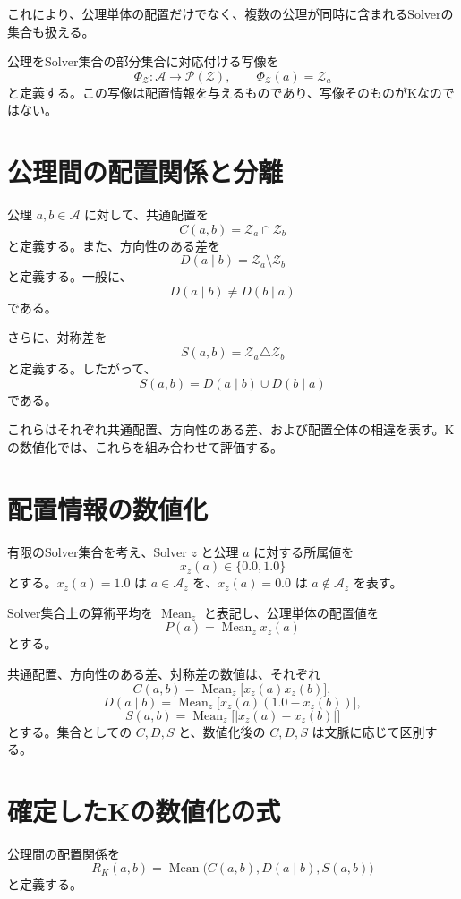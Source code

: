 \documentclass[a4paper,12pt]{article}
\begin{document}
これにより、公理単体の配置だけでなく、複数の公理が同時に含まれるSolverの集合も扱える。

公理をSolver集合の部分集合に対応付ける写像を
\[
\Phi_{\mathcal{Z}}:\mathcal{A}\to\mathcal{P}(\mathcal{Z}),
\qquad
\Phi_{\mathcal{Z}}(a)=\mathcal{Z}_a
\]
と定義する。この写像は配置情報を与えるものであり、写像そのものがKなのではない。

\section{公理間の配置関係と分離}

公理 $a,b\in\mathcal{A}$ に対して、共通配置を
\[
C(a,b)=\mathcal{Z}_a\cap\mathcal{Z}_b
\]
と定義する。また、方向性のある差を
\[
D(a\mid b)=\mathcal{Z}_a\setminus\mathcal{Z}_b
\]
と定義する。一般に、
\[
D(a\mid b)\ne D(b\mid a)
\]
である。

さらに、対称差を
\[
S(a,b)=\mathcal{Z}_a\triangle\mathcal{Z}_b
\]
と定義する。したがって、
\[
S(a,b)=D(a\mid b)\cup D(b\mid a)
\]
である。

これらはそれぞれ共通配置、方向性のある差、および配置全体の相違を表す。Kの数値化では、これらを組み合わせて評価する。

\section{配置情報の数値化}

有限のSolver集合を考え、Solver $z$ と公理 $a$ に対する所属値を
\[
x_z(a)\in\{0.0,1.0\}
\]
とする。$x_z(a)=1.0$ は $a\in\mathcal{A}_z$ を、$x_z(a)=0.0$ は $a\notin\mathcal{A}_z$ を表す。

Solver集合上の算術平均を $\operatorname{Mean}_z$ と表記し、公理単体の配置値を
\[
P(a)=\operatorname{Mean}_z x_z(a)
\]
とする。

共通配置、方向性のある差、対称差の数値は、それぞれ
\[
C(a,b)
=
\operatorname{Mean}_z\bigl[x_z(a)x_z(b)\bigr],
\]
\[
D(a\mid b)
=
\operatorname{Mean}_z\bigl[x_z(a)(1.0-x_z(b))\bigr],
\]
\[
S(a,b)
=
\operatorname{Mean}_z\bigl[|x_z(a)-x_z(b)|\bigr]
\]
とする。集合としての $C,D,S$ と、数値化後の $C,D,S$ は文脈に応じて区別する。

\section{確定したKの数値化の式}

公理間の配置関係を
\[
R_K(a,b)
=
\operatorname{Mean}\bigl(
C(a,b),D(a\mid b),S(a,b)
\bigr)
\]
と定義する。
\end{document}
